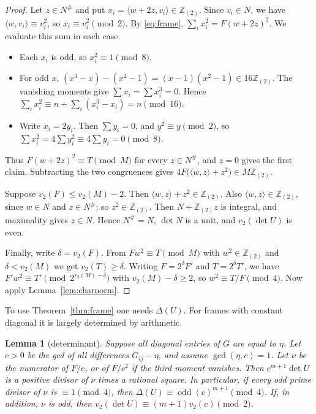 \documentclass[11pt]{article}
\newtheorem{lemma}[theorem]{Lemma}
\theoremstyle{definition}
\theoremstyle{remark}
\newcommand{\Z}{\mathbb Z}
\newcommand{\Zt}{\Z_{(2)}}
\newcommand{\ip}[2]{\langle #1,#2\rangle}
\newcommand{\odd}{\operatorname{odd}}
\begin{document}
\begin{proof}
Let $z\in N^\#$ and put $x_i=\ip{w+2z}{v_i}\in\Zt$. Since $v_i\in N$, we have
$\ip w{v_i}\equiv v_i^2$, so $x_i\equiv v_i^2\pmod 2$. By \eqref{eq:frame},
$\sum_ix_i^2=F(w+2z)^2$. We evaluate this sum in each case.
\begin{itemize}
\item[(a)] Each $x_i$ is odd, so $x_i^2\equiv1\pmod 8$.
\item[(b)] For odd $x$, $(x^3-x)-(x^2-1)=(x-1)(x^2-1)\in16\Zt$. The vanishing
moments give $\sum x_i=\sum x_i^3=0$. Hence
$\sum_i x_i^2\equiv n+\sum_i(x_i^3-x_i)=n\pmod{16}$.
\item[(c)] Write $x_i=2y_i$. Then $\sum y_i=0$, and $y^2\equiv y\pmod 2$, so
$\sum x_i^2=4\sum y_i^2\equiv4\sum y_i=0\pmod 8$.
\end{itemize}
Thus $F(w+2z)^2\equiv T\pmod M$ for every $z\in N^\#$, and $z=0$ gives the
first claim. Subtracting the two congruences gives
$4F\bigl(\ip wz+z^2\bigr)\in M\Zt$.

Suppose $v_2(F)\le v_2(M)-2$. Then $\ip wz+z^2\in\Zt$. Also $\ip wz\in\Zt$, since
$w\in N$ and $z\in N^\#$; so $z^2\in\Zt$. Then $N+\Zt z$ is integral, and
maximality gives $z\in N$. Hence $N^\#=N$, $\det N$ is a unit, and
$v_2(\det U)$ is even.

Finally, write $\delta=v_2(F)$. From $Fw^2\equiv T\pmod M$ with $w^2\in\Zt$ and
$\delta<v_2(M)$ we get $v_2(T)\ge\delta$. Writing $F=2^\delta F'$ and
$T=2^\delta T'$, we have
$F'w^2\equiv T'\pmod{2^{v_2(M)-\delta}}$ with $v_2(M)-\delta\ge2$, so
$w^2\equiv T/F\pmod 4$. Now apply Lemma~\ref{lem:charnorm}.
\end{proof}

To use Theorem~\ref{thm:frame} one needs $\Delta(U)$. For frames with constant
diagonal it is largely determined by arithmetic.

\begin{lemma}[determinant]\label{lem:det}
Suppose all diagonal entries of $G$ are equal to $\eta$. Let $c>0$ be the
gcd of all differences $G_{ij}-\eta$, and assume $\gcd(\eta,c)=1$. Let $\nu$
be the numerator of $F/c$, or of $F/c^2$ if the third moment vanishes. Then
$c^{m+1}\det U$ is a positive divisor of $\nu$ times a rational square.
In particular, if every odd prime divisor of $\nu$ is $\equiv1\pmod 4$, then
$\Delta(U)\equiv\odd(c)^{m+1}\pmod 4$. If, in addition, $\nu$ is odd, then
$v_2(\det U)\equiv(m+1)v_2(c)\pmod 2$.
\end{lemma}
\end{document}

